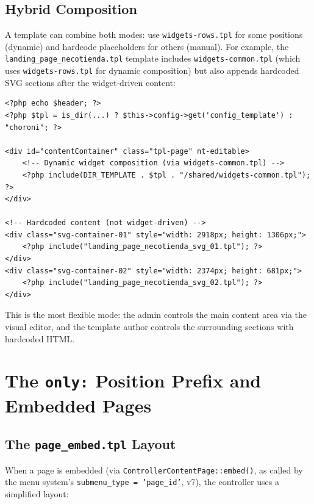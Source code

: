 \documentclass[11pt,a4paper]{article}
\begin{document}
\subsection{Hybrid Composition}

A template can combine both modes: use \texttt{widgets-rows.tpl} for
some positions (dynamic) and hardcode placeholders for others (manual).
For example, the \texttt{landing\_page\_necotienda.tpl} template
includes \texttt{widgets-common.tpl} (which uses
\texttt{widgets-rows.tpl} for dynamic composition) but also appends
hardcoded SVG sections after the widget-driven content:

\begin{lstlisting}[caption={Hybrid composition in \texttt{landing\_page\_necotienda.tpl}.},label={lst:hybrid}]
<?php echo $header; ?>
<?php $tpl = is_dir(...) ? $this->config->get('config_template') : "choroni"; ?>

<div id="contentContainer" class="tpl-page" nt-editable>
    <!-- Dynamic widget composition (via widgets-common.tpl) -->
    <?php include(DIR_TEMPLATE . $tpl . "/shared/widgets-common.tpl"); ?>
</div>

<!-- Hardcoded content (not widget-driven) -->
<div class="svg-container-01" style="width: 2918px; height: 1306px;">
    <?php include("landing_page_necotienda_svg_01.tpl"); ?>
</div>
<div class="svg-container-02" style="width: 2374px; height: 681px;">
    <?php include("landing_page_necotienda_svg_02.tpl"); ?>
</div>
\end{lstlisting}

This is the most flexible mode: the admin controls the main content area
via the visual editor, and the template author controls the surrounding
sections with hardcoded HTML.

\section{The \texttt{only:} Position Prefix and Embedded Pages}\label{sec:only-prefix}

\subsection{The \texttt{page\_embed.tpl} Layout}

When a page is embedded (via \texttt{ControllerContentPage::embed()}, as
called by the menu system's \texttt{submenu\_type = 'page\_id'}, v7),
the controller uses a simplified layout:
\end{document}
